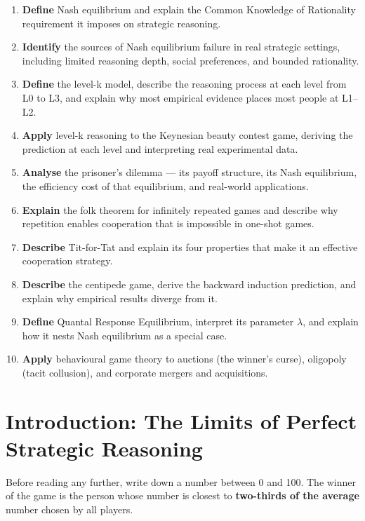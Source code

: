 \documentclass[12pt, letterpaper]{article}
\begin{document}
\begin{enumerate}
\item \textbf{Define} Nash equilibrium and explain the Common Knowledge of Rationality requirement it imposes on strategic reasoning.
\item \textbf{Identify} the sources of Nash equilibrium failure in real strategic settings, including limited reasoning depth, social preferences, and bounded rationality.
\item \textbf{Define} the level-k model, describe the reasoning process at each level from L0 to L3, and explain why most empirical evidence places most people at L1--L2.
\item \textbf{Apply} level-k reasoning to the Keynesian beauty contest game, deriving the prediction at each level and interpreting real experimental data.
\item \textbf{Analyse} the prisoner's dilemma --- its payoff structure, its Nash equilibrium, the efficiency cost of that equilibrium, and real-world applications.
\item \textbf{Explain} the folk theorem for infinitely repeated games and describe why repetition enables cooperation that is impossible in one-shot games.
\item \textbf{Describe} Tit-for-Tat and explain its four properties that make it an effective cooperation strategy.
\item \textbf{Describe} the centipede game, derive the backward induction prediction, and explain why empirical results diverge from it.
\item \textbf{Define} Quantal Response Equilibrium, interpret its parameter $\lambda$, and explain how it nests Nash equilibrium as a special case.
\item \textbf{Apply} behavioural game theory to auctions (the winner's curse), oligopoly (tacit collusion), and corporate mergers and acquisitions.
\end{enumerate}

\medskip


\section*{Introduction: The Limits of Perfect Strategic Reasoning}


Before reading any further, write down a number between 0 and 100. The winner of the game is the person whose number is closest to \textbf{two-thirds of the average} number chosen by all players.
\end{document}
